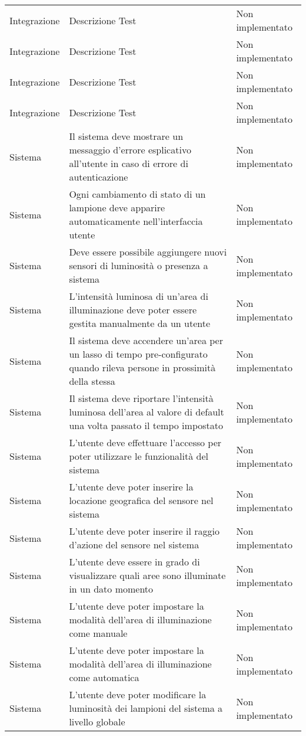 \begin{center}
\begin{xltabular}{\linewidth}{|l|X|l|}
        \hline
        Integrazione & Descrizione Test & Non implementato\\
        Integrazione & Descrizione Test & Non implementato\\
        Integrazione & Descrizione Test & Non implementato\\
        Integrazione & Descrizione Test & Non implementato\\
        \hline
        Sistema & Il sistema deve mostrare un messaggio d'errore esplicativo all'utente in caso di errore di autenticazione & Non implementato\\
        Sistema & Ogni cambiamento di stato di un lampione deve apparire automaticamente nell'interfaccia utente & Non implementato\\
        Sistema & Deve essere possibile aggiungere nuovi sensori di luminosità o presenza a sistema & Non implementato\\
        Sistema & L'intensità luminosa di un'area di illuminazione deve poter essere gestita manualmente da un utente & Non implementato\\
        Sistema & Il sistema deve accendere un'area per un lasso di tempo pre-configurato quando rileva persone in prossimità della stessa & Non implementato\\
        Sistema & Il sistema deve riportare l'intensità luminosa dell'area al valore di default una volta passato il tempo impostato & Non implementato\\
        Sistema & L'utente deve effettuare l'accesso per poter utilizzare le funzionalità del sistema & Non implementato\\
        Sistema & L'utente deve poter inserire la locazione geografica del sensore nel sistema & Non implementato\\
        Sistema & L'utente deve poter inserire il raggio d'azione del sensore nel sistema & Non implementato\\
        Sistema & L'utente deve essere in grado di visualizzare quali aree sono illuminate in un dato momento & Non implementato\\
        Sistema & L'utente deve poter impostare la modalità dell'area di illuminazione come manuale & Non implementato\\
        Sistema & L'utente deve poter impostare la modalità dell'area di illuminazione come automatica & Non implementato\\
        Sistema & L'utente deve poter modificare la luminosità dei lampioni del sistema a livello globale & Non implementato\\

\end{xltabular}
\end{center}
